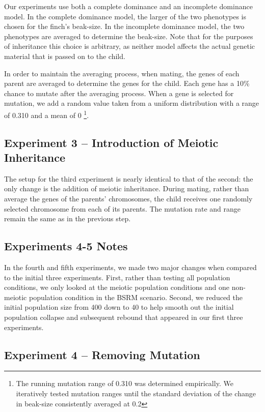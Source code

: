 \documentclass{article}
\begin{document}
Our experiments use both a complete dominance and an incomplete dominance model. In the complete dominance model, the larger of the two phenotypes is chosen for the finch's beak-size. In the incomplete dominance model, the two phenotypes are averaged to determine the beak-size. Note that for the purposes of inheritance this choice is arbitrary, as neither model affects the actual genetic material that is passed on to the child. 

In order to maintain the averaging process, when mating, the genes of each parent are averaged to determine the genes for the child. Each gene has a 10\% chance to mutate after the averaging process. When a gene is selected for mutation, we add a random value taken from a uniform distribution with a range of 0.310 and a mean of 0 \footnote{The running mutation range of 0.310 was determined empirically. We iteratively tested mutation ranges until the standard deviation of the change in beak-size consistently averaged at 0.2}.


	
\subsection{Experiment 3 -- Introduction of Meiotic
Inheritance}

The setup for the third experiment is nearly identical to that of the second: the only change is the addition of meiotic inheritance. During mating, rather than average the genes of the parents' chromosomes, the child receives one randomly selected chromosome from each of its parents. The mutation rate and range remain the same as in the previous step. 



\subsection{Experiments 4-5 Notes}

In the fourth and fifth experiments, we made two major changes when compared to the initial three experiments. First, rather than testing all population conditions, we only looked at the meiotic population conditions and one non-meiotic population condition in the BSRM scenario. Second, we reduced the initial population size from 400 down to 40 to help smooth out the initial population collapse and subsequent rebound that appeared in our first three experiments.

\subsection{Experiment 4 -- Removing Mutation}
\end{document}
